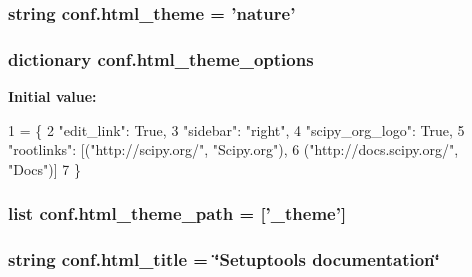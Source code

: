 \subsubsection[{html\+\_\+theme}]{\setlength{\rightskip}{0pt plus 5cm}string conf.\+html\+\_\+theme = 'nature'}\label{namespaceconf_a7f1b143ff25817758abd21a7db110510}
\hypertarget{namespaceconf_a59fb37ca5915e18823f5f433129b35ec}{}
\subsubsection[{html\+\_\+theme\+\_\+options}]{\setlength{\rightskip}{0pt plus 5cm}dictionary conf.\+html\+\_\+theme\+\_\+options}\label{namespaceconf_a59fb37ca5915e18823f5f433129b35ec}
{\bfseries Initial value\+:}
\begin{DoxyCode}
1 = \{
2             \textcolor{stringliteral}{"edit\_link"}: \textcolor{keyword}{True},
3             \textcolor{stringliteral}{"sidebar"}: \textcolor{stringliteral}{"right"},
4             \textcolor{stringliteral}{"scipy\_org\_logo"}: \textcolor{keyword}{True},
5             \textcolor{stringliteral}{"rootlinks"}: [(\textcolor{stringliteral}{"http://scipy.org/"}, \textcolor{stringliteral}{"Scipy.org"}),
6                           (\textcolor{stringliteral}{"http://docs.scipy.org/"}, \textcolor{stringliteral}{"Docs"})]
7         \}
\end{DoxyCode}
\hypertarget{namespaceconf_a98891f2e4a5d0fc6e8cbe787fb9c2439}{}
\subsubsection[{html\+\_\+theme\+\_\+path}]{\setlength{\rightskip}{0pt plus 5cm}list conf.\+html\+\_\+theme\+\_\+path = \mbox{[}'\+\_\+theme'\mbox{]}}\label{namespaceconf_a98891f2e4a5d0fc6e8cbe787fb9c2439}
\hypertarget{namespaceconf_a21723aa72b000ec08ec9fdab86bddebb}{}
\subsubsection[{html\+\_\+title}]{\setlength{\rightskip}{0pt plus 5cm}string conf.\+html\+\_\+title = \char`\"{}Setuptools documentation\char`\"{}}\label{namespaceconf_a21723aa72b000ec08ec9fdab86bddebb}
\hypertarget{namespaceconf_af06bd0927581dbe55f99799545d18bd6}{}
